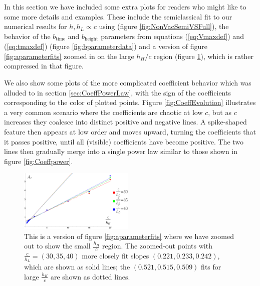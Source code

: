 In this section we have included some extra plots for readers who might like to some more details and examples.  These include  the semiclassical fit to our numerical results for $h, h_L \propto c$ using \cite{Fitzpatrick:2016mjq} (figure \ref{fig:NonVacSemiVSFull}), the behavior of the $b_\text{time}$ and $b_\text{height}$ parameters from equations (\ref{eq:Vmaxdef}) and (\ref{eq:tmaxdef}) (figure \ref{fig:bparameterdata}) and a version of figure \ref{fig:aparameterfits} zoomed in on the large $h_H/c$ region (figure \ref{fig:at_large_hh}), which is rather compressed in that figure.

We also show some plots of the more complicated coefficient behavior which was 
alluded to in section \ref{sec:CoeffPowerLaw}, with the sign of the coefficients corresponding to the color of plotted points. Figure \ref{fig:CoeffEvolution} illustrates a very common scenario where the coefficients are chaotic at low $c$, but as $c$ increases they coalesce into distinct positive and negative lines. A  spike-shaped feature then appears at low order and moves upward, turning the coefficients that it passes positive, until all (visible) coefficients have become positive. The two lines then gradually merge into a single power law similar to those shown in figure \ref{fig:Coeffpower}.

\begin{figure}[h]
\begin{centering}
\includegraphics[width=0.49\textwidth]{virasoro_chapter/at_small_hh}
	\caption{ This is a version of figure \ref{fig:aparameterfits} where we have zoomed out to show the small $\frac{h_H}{c}$ region. The zoomed-out points with $\frac{c}{h_L} = (30, 35, 40)$ more closely fit slopes $(0.221, 0.233, 0.242)$, which are shown as solid lines; the $(0.521, 0.515, 0.509)$ fits for large $\frac{h_H}{c}$ are shown as dotted lines.  }
\label{fig:at_large_hh}
\end{centering}
\end{figure}

